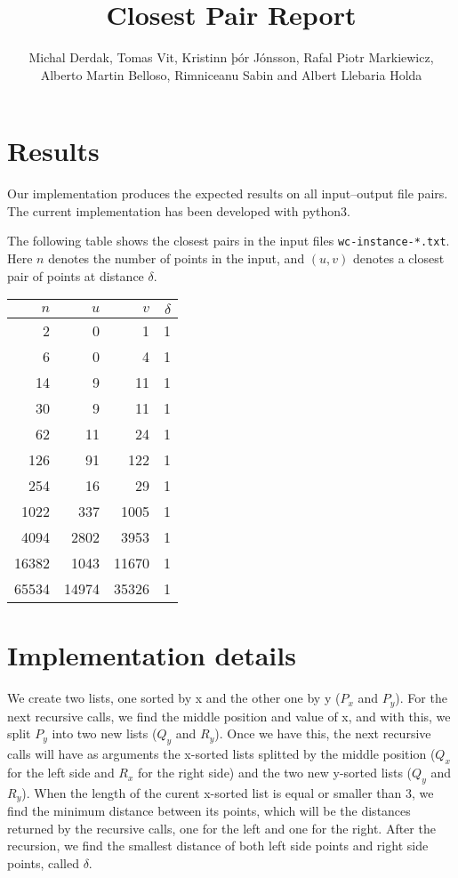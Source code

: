 \documentclass{tufte-handout}
\title{Closest Pair Report}
\author{Michal Derdak, Tomas Vit, Kristinn þór Jónsson, Rafal Piotr Markiewicz, Alberto Martin Belloso, Rimniceanu Sabin and Albert Llebaria Holda}
\begin{document}
  \maketitle

  \section{Results}

  Our implementation produces the expected results on all input--output file pairs. 
  The current implementation has been developed with python3.

  The following table shows the closest pairs in the input files {\tt wc-instance-*.txt}.
  Here $n$ denotes the number of points in the input,
  and $(u,v)$ denotes a closest pair of points at distance $\delta$.

  \bigskip\noindent
  \begin{tabular}{rrrr}\toprule
    $n$ & $u$ & $v$ & $\delta$ \\\midrule
    2 & 0 & 1 & 1 \\
    6 & 0 & 4 & 1 \\
    14 & 9 & 11 & 1 \\
    30 & 9 & 11 & 1 \\
    62 & 11 & 24 & 1 \\
    126 & 91 & 122 & 1 \\
    254 & 16 & 29 & 1 \\
    1022 & 337 & 1005 & 1 \\
    4094 & 2802 & 3953 & 1 \\
    16382 & 1043 & 11670 & 1 \\
    65534 & 14974 & 35326 & 1 \\
  \end{tabular}


  \section{Implementation details}
  We create two lists, one sorted by x and the other one by y ($P_x$ and $P_y$).
  For the next recursive calls, we find the middle position and value of x, and with this, we split        $P_y$ into two new lists ($Q_y$ and $R_y$). Once we have this, the next recursive calls will have as arguments the x-sorted lists splitted by the middle position ($Q_x$ for the left side and $R_x$ for the right side) and the two new y-sorted lists ($Q_y$ and $R_y$). 
  When the length of the curent x-sorted list is equal or smaller than 3, we find the minimum distance between its points, which will be the distances returned by the recursive calls, one for the left and one for the right. 
  After the recursion, we find the smallest distance of both left side points and right side points, called $\delta$.  
\end{document}
